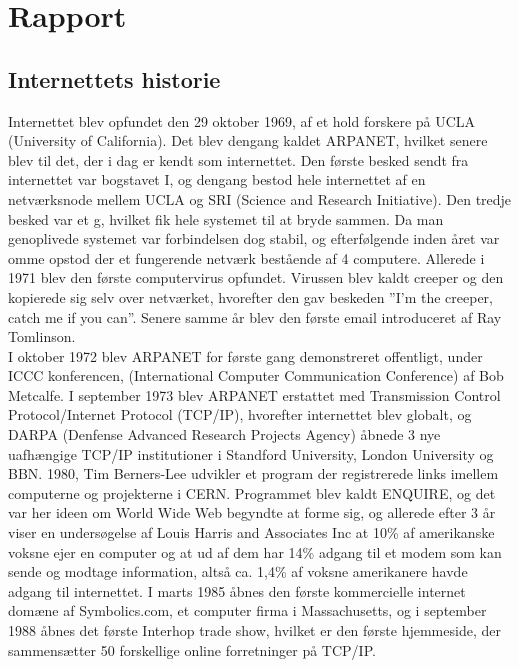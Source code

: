 \chapter{Rapport}

    \section{Internettets historie}
        Internettet blev opfundet den 29 oktober 1969, af et hold forskere på UCLA (University of California). Det blev dengang kaldet ARPANET, hvilket senere blev til det, der i dag er kendt som internettet. 
        Den første besked sendt fra internettet var bogstavet I, og dengang bestod hele internettet af en netværksnode mellem UCLA og SRI (Science and Research Initiative). 
        Den tredje besked var et g, hvilket fik hele systemet til at bryde sammen. 
        Da man genoplivede systemet var forbindelsen dog stabil, og efterfølgende inden året var omme opstod der et fungerende netværk bestående af 4 computere.
        Allerede i 1971 blev den første computervirus opfundet. Virussen blev kaldt creeper og den kopierede sig selv over netværket, hvorefter den gav beskeden ”I’m the creeper, catch me if you can”. Senere samme år blev den første email introduceret af Ray Tomlinson.\\
        I oktober 1972 blev ARPANET for første gang demonstreret offentligt, under ICCC konferencen, (International Computer Communication Conference) af Bob Metcalfe. I september 1973 blev ARPANET erstattet med Transmission Control Protocol/Internet Protocol (TCP/IP), hvorefter internettet blev globalt, og DARPA (Denfense Advanced Research Projects Agency) åbnede 3 nye uafhængige TCP/IP institutioner i Standford University, London University og BBN.
        1980, Tim Berners-Lee udvikler et program der registrerede links imellem computerne og projekterne i CERN. 
        Programmet blev kaldt ENQUIRE, og det var her ideen om World Wide Web begyndte at forme sig, og allerede efter 3 år viser en undersøgelse af Louis Harris and Associates Inc at 10\% af amerikanske voksne ejer en computer og at ud af dem har 14\% adgang til et modem som kan sende og modtage information, altså ca. 1,4\% af voksne amerikanere havde adgang til internettet. 
        I marts 1985 åbnes den første kommercielle internet domæne af Symbolics.com, et computer firma i Massachusetts, og
        i september 1988 åbnes det første Interhop trade show, hvilket er den første hjemmeside, der sammensætter 50 forskellige online forretninger på TCP/IP.\\
